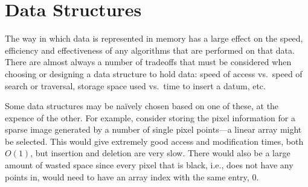
\part{Data Structures}
\label{prt:data_structures}

The way in which data is represented in memory has a large effect on the speed,
efficiency and effectiveness of any algorithms that are performed on that data.
There are almost always a number of tradeoffs that must be considered when
choosing or designing a data structure to hold data: speed of access vs.\ speed
of search or traversal, storage space used vs.\ time to insert a datum, etc.

Some data structures may be na\"ively chosen based on one of these, at the
expence of the other. For example, consider storing the pixel information for a
sparse image generated by a number of single pixel points---a linear array
might be selected. This would give extremely good access and modification
times, both $O(1)$, but insertion and deletion are very slow. There would also
be a large amount of wasted space since every pixel that is black, i.e., does
not have any points in, would need to have an array index with the same entry,
$0$.
